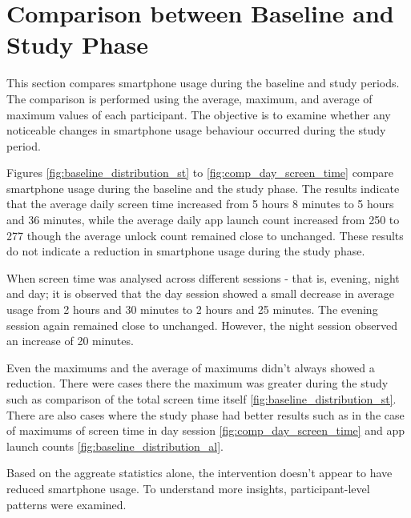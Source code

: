 \documentclass[11pt]{report}
\begin{document}
\section{Comparison between Baseline and Study Phase}

This section compares smartphone usage during the baseline and study periods. 
The comparison is performed using the average, maximum, and average of maximum values of each participant. 
The objective is to examine whether any noticeable changes in smartphone usage 
behaviour occurred during the study period.

Figures \ref{fig:baseline_distribution_st} to \ref{fig:comp_day_screen_time} compare 
smartphone usage during the baseline and the study phase. The results indicate that the average 
daily screen time increased from 5 hours 8 minutes to 5 hours and 36 minutes, while the
average daily app launch count increased from 250 to 277 though the average unlock count remained close to unchanged.
These results do not indicate a reduction in smartphone usage during the study phase. 

When screen time was analysed across different sessions - that is, evening, night and day; it is observed that 
the day session showed a small decrease in average usage from 2 hours and 30 minutes to 2 hours and 25 minutes.
The evening session again remained close to unchanged. However, the night session observed an increase of 20 minutes. 

Even the maximums and the average of maximums didn't always showed a reduction. 
There were cases there the maximum was greater during the study such as comparison of 
the total screen time itself \ref{fig:baseline_distribution_st}. 
There are also cases where the study phase had better results such as in the case of 
maximums of screen time in day session \ref{fig:comp_day_screen_time} and app launch counts \ref{fig:baseline_distribution_al}.

Based on the aggreate statistics alone, the intervention doesn't appear to have reduced
smartphone usage. To understand more insights, participant-level patterns were examined.
\end{document}
